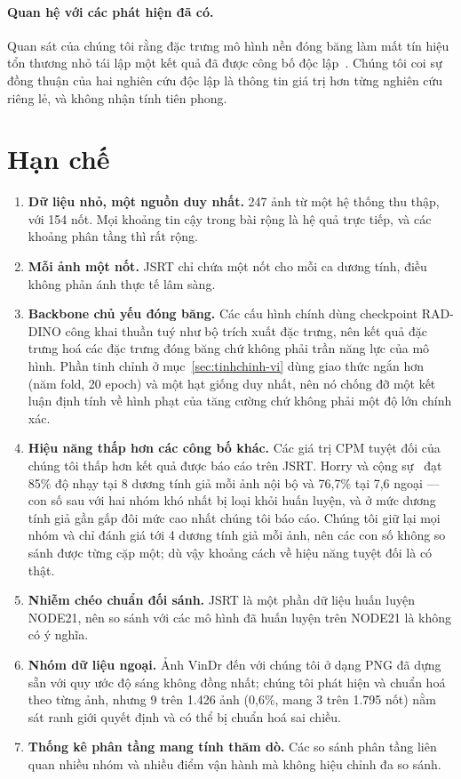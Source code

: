 \documentclass[12pt,a4paper]{article}
\begin{document}
\paragraph{Quan hệ với các phát hiện đã có.}
Quan sát của chúng tôi rằng đặc trưng mô hình nền đóng băng làm mất tín hiệu tổn
thương nhỏ tái lập một kết quả đã được công bố độc
lập~\cite{muthyala2026frozen}. Chúng tôi coi sự đồng thuận của hai nghiên cứu độc
lập là thông tin giá trị hơn từng nghiên cứu riêng lẻ, và không nhận tính tiên
phong.

\section{Hạn chế}

\begin{enumerate}
  \item \textbf{Dữ liệu nhỏ, một nguồn duy nhất.} 247 ảnh từ một hệ thống thu
        thập, với 154 nốt. Mọi khoảng tin cậy trong bài rộng là hệ quả trực tiếp,
        và các khoảng phân tầng thì rất rộng.
  \item \textbf{Mỗi ảnh một nốt.} JSRT chỉ chứa một nốt cho mỗi ca dương tính,
        điều không phản ánh thực tế lâm sàng.
  \item \textbf{Backbone chủ yếu đóng băng.} Các cấu hình chính dùng checkpoint
        RAD-DINO công khai thuần tuý như bộ trích xuất đặc trưng, nên kết quả đặc
        trưng hoá các đặc trưng đóng băng chứ không phải trần năng lực của mô
        hình. Phần tinh chỉnh ở mục~\ref{sec:tinhchinh-vi} dùng giao thức ngắn
        hơn (năm fold, 20 epoch) và một hạt giống duy nhất, nên nó chống đỡ một
        kết luận định tính về hình phạt của tăng cường chứ không phải một độ lớn
        chính xác.
  \item \textbf{Hiệu năng thấp hơn các công bố khác.} Các giá trị CPM tuyệt đối
        của chúng tôi thấp hơn kết quả được báo cáo trên JSRT. Horry và cộng
        sự~\cite{horry2023fullres} đạt 85\% độ nhạy tại 8 dương tính giả mỗi ảnh
        nội bộ và 76,7\% tại 7,6 ngoại --- con số sau với hai nhóm khó nhất bị
        loại khỏi huấn luyện, và ở mức dương tính giả gần gấp đôi mức cao nhất
        chúng tôi báo cáo. Chúng tôi giữ lại mọi nhóm và chỉ đánh giá tới 4 dương
        tính giả mỗi ảnh, nên các con số không so sánh được từng cặp một; dù vậy
        khoảng cách về hiệu năng tuyệt đối là có thật.
  \item \textbf{Nhiễm chéo chuẩn đối sánh.} JSRT là một phần dữ liệu huấn luyện
        NODE21, nên so sánh với các mô hình đã huấn luyện trên NODE21 là không có
        ý nghĩa.
  \item \textbf{Nhóm dữ liệu ngoại.} Ảnh VinDr đến với chúng tôi ở dạng PNG đã
        dựng sẵn với quy ước độ sáng không đồng nhất; chúng tôi phát hiện và
        chuẩn hoá theo từng ảnh, nhưng 9 trên 1.426 ảnh (0,6\%, mang 3 trên 1.795
        nốt) nằm sát ranh giới quyết định và có thể bị chuẩn hoá sai chiều.
  \item \textbf{Thống kê phân tầng mang tính thăm dò.} Các so sánh phân tầng liên
        quan nhiều nhóm và nhiều điểm vận hành mà không hiệu chỉnh đa so sánh.
\end{enumerate}
\end{document}
